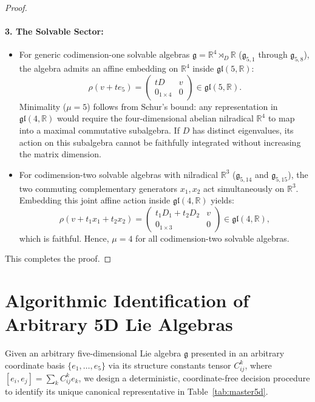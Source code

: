 \documentclass[11pt,a4paper]{article}
\theoremstyle{definition}
\theoremstyle{remark}
\newcommand{\R}{\mathbb{R}}
\newcommand{\g}{\mathfrak{g}}
\begin{document}
\begin{proof}
\paragraph{3. The Solvable Sector:}
\begin{itemize}
    \item For generic codimension-one solvable algebras $\g = \R^4 \rtimes_D \R$ ($\g_{5,1}$ through $\g_{5,8}$), the algebra admits an affine embedding on $\R^4$ inside $\mathfrak{gl}(5, \R)$:
    \begin{equation}
        \rho(v + t e_5) = \begin{pmatrix} t D & v \\ 0_{1 \times 4} & 0 \end{pmatrix} \in \mathfrak{gl}(5, \R).
    \end{equation}
    Minimality ($\mu = 5$) follows from Schur's bound: any representation in $\mathfrak{gl}(4, \R)$ would require the four-dimensional abelian nilradical $\R^4$ to map into a maximal commutative subalgebra. If $D$ has distinct eigenvalues, its action on this subalgebra cannot be faithfully integrated without increasing the matrix dimension.
    
    \item For codimension-two solvable algebras with nilradical $\R^3$ ($\g_{5,14}$ and $\g_{5,15}$), the two commuting complementary generators $x_1, x_2$ act simultaneously on $\R^3$. Embedding this joint affine action inside $\mathfrak{gl}(4, \R)$ yields:
    \begin{equation}
        \rho(v + t_1 x_1 + t_2 x_2) = \begin{pmatrix} t_1 D_1 + t_2 D_2 & v \\ 0_{1 \times 3} & 0 \end{pmatrix} \in \mathfrak{gl}(4, \R),
    \end{equation}
    which is faithful. Hence, $\mu = 4$ for all codimension-two solvable algebras.
\end{itemize}
This completes the proof.
\end{proof}

\section{Algorithmic Identification of Arbitrary 5D Lie Algebras}\label{sec:algorithm}

Given an arbitrary five-dimensional Lie algebra $\g$ presented in an arbitrary coordinate basis $\{e_1, \dots, e_5\}$ via its structure constants tensor $C_{ij}^k$, where $[e_i, e_j] = \sum_k C_{ij}^k e_k$, we design a deterministic, coordinate-free decision procedure to identify its unique canonical representative in Table~\ref{tab:master5d}.
\end{document}
